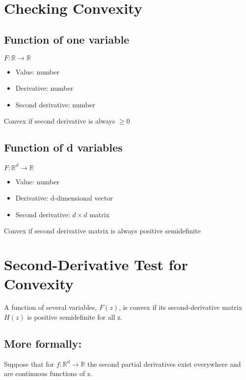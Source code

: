 \documentclass{article}
\begin{document}
\section{Checking Convexity}

\subsection{Function of one variable}

$F:\mathbb{R}\longrightarrow\mathbb{R}$

\begin{itemize}
    \item Value: number
    \item Derivative: number
    \item Second derivative: number
\end{itemize}

Convex if second derivative is always $\ge0$

\subsection{Function of d variables}

$F:\mathbb{R}^{d}\longrightarrow\mathbb{R}$

\begin{itemize}
    \item Value: number
    \item Derivative: d-dimensional vector
    \item Second derivative: $d\times d$ matrix
\end{itemize}

Convex if second derivative matrix is always positive semidefinite

\section{Second-Derivative Test for Convexity}

A function of several variables, $F(z)$, is convex if its second-derivative matrix $H(z)$ is positive semidefinite for all z.

\subsection{More formally:}

Suppose that for $f:\mathbb{R}^{d}\rightarrow\mathbb{R}$ the second partial derivatives exist everywhere and are continuous functions of z.
\end{document}
